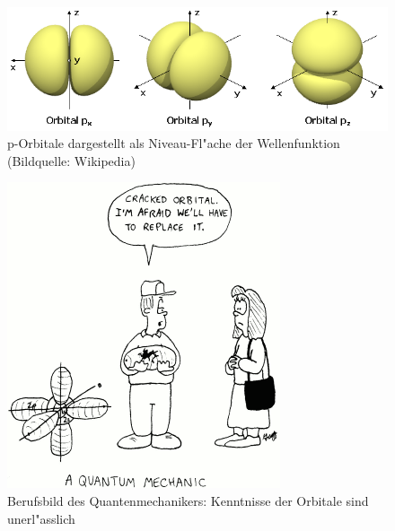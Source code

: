 \begin{figure}
\centering
\includegraphics[width=\hsize]{images/orbital.png}
\caption{p-Orbitale dargestellt als Niveau-Fl"ache der Wellenfunktion
(Bildquelle: Wikipedia)
\label{skript:porbitale}}
\end{figure}

\begin{figure}
\centering
\includegraphics[width=0.4\hsize]{images/crackedorbital.png}
\caption{Berufsbild des Quantenmechanikers: Kenntnisse der Orbitale
sind unerl"asslich\label{skript:crackedorbital}}
\end{figure}
